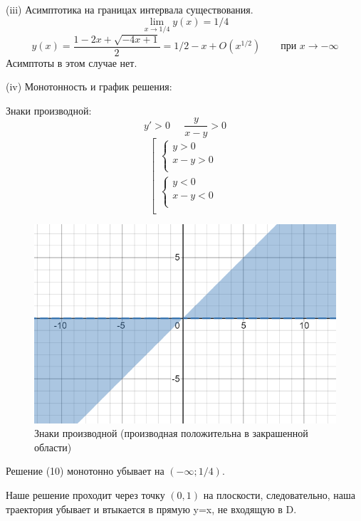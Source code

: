 \documentclass[a4paper, 12pt]{article}
\begin{document}
(iii) Асимптотика на границах интервала существования.\\
\[\lim_{x\rightarrow 1/4} y(x) =1/4\]
\[y(x) = \frac {1-2x+\sqrt{-4x+1}}{2} = 1/2-x+O(x^{1/2}) \quad \quad \text{при $x \rightarrow - \infty$} \]
Асимптоты в этом случае нет. 


(iv) Монотонность и график решения:

Знаки производной:
\[y' > 0\;\;\;\;\; \frac y {x-y}>0\]
\[
\left[ 
  \begin{gathered} 
    \left\{ 
      \begin{gathered} 
        y  > 0
        \\ 
         x -  y > 0
        \\
      \end{gathered} 
    \right.  
    \\ 
    \left\{ 
      \begin{gathered} 
        y  < 0
        \\ 
        x - y < 0
        \\
      \end{gathered} 
    \right.
    \\
  \end{gathered}
\right.
\]

\begin{figure}[H]
	\centering
	\includegraphics[scale=0.7]{10}
	\caption{Знаки производной (производная положительна в закрашенной области)}
\end{figure}

Решение (10) монотонно убывает на $(-\infty; 1/4)$.

Наше решение проходит через точку $(0, 1)$ на плоскости, следовательно, наша траектория убывает и втыкается в прямую y=x, не входящую в D. 
\end{document}
